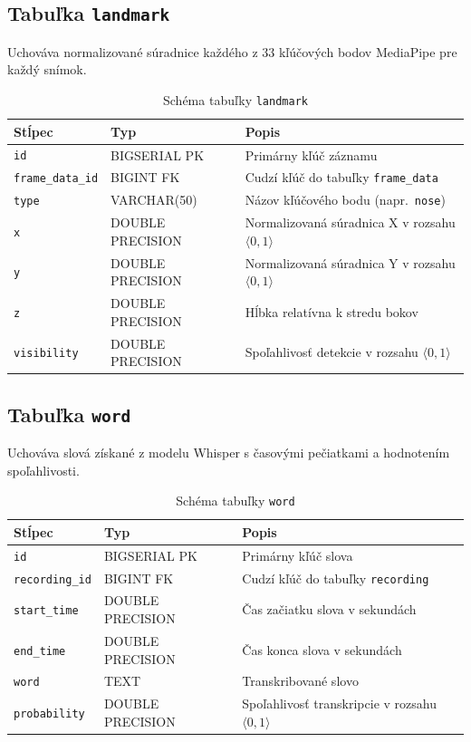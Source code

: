 \subsection{Tabuľka \texttt{landmark}}

Uchováva normalizované súradnice každého z 33 kľúčových bodov MediaPipe pre každý snímok.

\begin{table}[ht]
\centering
\caption{Schéma tabuľky \texttt{landmark}}
\begin{tabular}{|l|l|l|}
\hline
\textbf{Stĺpec} & \textbf{Typ} & \textbf{Popis} \\
\hline
\texttt{id} & BIGSERIAL PK & Primárny kľúč záznamu \\
\texttt{frame\_data\_id} & BIGINT FK & Cudzí kľúč do tabuľky \texttt{frame\_data} \\
\texttt{type} & VARCHAR(50) & Názov kľúčového bodu (napr.\ \texttt{nose}) \\
\texttt{x} & DOUBLE PRECISION & Normalizovaná súradnica X v rozsahu $\langle 0, 1\rangle$ \\
\texttt{y} & DOUBLE PRECISION & Normalizovaná súradnica Y v rozsahu $\langle 0, 1\rangle$ \\
\texttt{z} & DOUBLE PRECISION & Hĺbka relatívna k stredu bokov \\
\texttt{visibility} & DOUBLE PRECISION & Spoľahlivosť detekcie v rozsahu $\langle 0, 1\rangle$ \\
\hline
\end{tabular}
\end{table}

\subsection{Tabuľka \texttt{word}}

Uchováva slová získané z modelu Whisper s časovými pečiatkami a hodnotením spoľahlivosti.

\begin{table}[ht]
\centering
\caption{Schéma tabuľky \texttt{word}}
\begin{tabular}{|l|l|l|}
\hline
\textbf{Stĺpec} & \textbf{Typ} & \textbf{Popis} \\
\hline
\texttt{id} & BIGSERIAL PK & Primárny kľúč slova \\
\texttt{recording\_id} & BIGINT FK & Cudzí kľúč do tabuľky \texttt{recording} \\
\texttt{start\_time} & DOUBLE PRECISION & Čas začiatku slova v sekundách \\
\texttt{end\_time} & DOUBLE PRECISION & Čas konca slova v sekundách \\
\texttt{word} & TEXT & Transkribované slovo \\
\texttt{probability} & DOUBLE PRECISION & Spoľahlivosť transkripcie v rozsahu $\langle 0, 1\rangle$ \\
\hline
\end{tabular}
\end{table}


